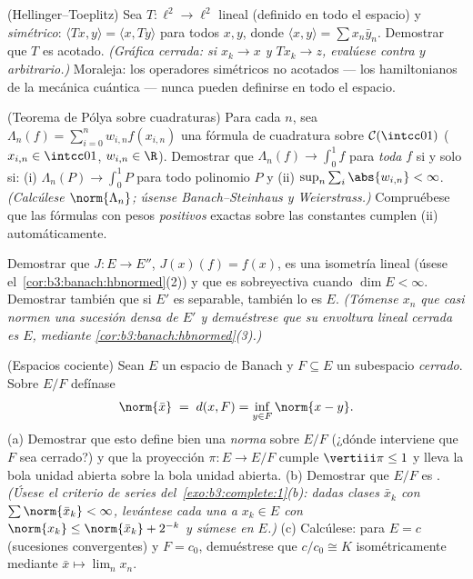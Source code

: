 \begin{exercise}[$\star\star\star$]\label{exo:b3:banach:8}
(Hellinger--Toeplitz) Sea $T \colon \ell^2 \to \ell^2$ lineal (definido
en todo el espacio) y \emph{simétrico}: $\langle Tx,
y\rangle = \langle x, Ty\rangle$ para todos $x, y$, donde $\langle
x, y \rangle = \sum x_n\bar y_n$. Demostrar que $T$ es acotado.
\emph{(Gráfica cerrada: si $x_k \to x$ y $Tx_k \to z$, evalúese contra
$y$ arbitrario.)} Moraleja: los operadores simétricos no acotados ---
los hamiltonianos de la mecánica cuántica --- nunca pueden definirse en
todo el espacio.
\end{exercise}

\begin{exercise}[$\star\star\star$]\label{exo:b3:banach:9}
(Teorema de Pólya sobre cuadraturas) Para cada $n$, sea $\Lambda_n(f)
= \sum_{i=0}^{n} w_{i,n}f(x_{i,n})$ una fórmula de cuadratura sobre
$\mathcal C(\intcc01)$ ($x_{i,n} \in \intcc01$, $w_{i,n} \in
\R$). Demostrar que $\Lambda_n(f) \to \int_0^1f$ para \emph{toda} $f$
 si y solo si: (i)
$\Lambda_n(P) \to \int_0^1P$ para todo polinomio $P$ y (ii)
$\sup_n\sum_i\abs{w_{i,n}} <
\infty$. \emph{(Calcúlese $\norm{\Lambda_n}$; úsense Banach--Steinhaus y
Weierstrass.)} Compruébese que las fórmulas con pesos \emph{positivos}
exactas sobre las constantes cumplen (ii) automáticamente.
\end{exercise}

\begin{exercise}[$\star\star$]\label{exo:b3:banach:10}
Demostrar que $J \colon E \to E''$, $J(x)(f) = f(x)$, es una isometría
lineal (úsese el~\cref{cor:b3:banach:hbnormed}(2)) y que es sobreyectiva
cuando $\dim E < \infty$. Demostrar también que si $E'$ es separable,
también lo es $E$. \emph{(Tómense $x_n$ que casi normen una sucesión
densa de $E'$ y demuéstrese que su envoltura lineal cerrada es $E$,
mediante
\cref{cor:b3:banach:hbnormed}(3).)}
\end{exercise}

\begin{exercise}[$\star\star$]\label{exo:b3:banach:11}
(Espacios cociente) Sean $E$ un espacio de Banach y $F \subseteq
E$ un subespacio \emph{cerrado}. Sobre $E/F$ defínase
\[
\norm{\bar x} \;=\; d(x, F) = \inf_{y\in F}\norm{x - y} .
\]
(a) Demostrar que esto define bien una \emph{norma} sobre $E/F$ (¿dónde
interviene que $F$ sea cerrado?) y que la proyección $\pi
\colon E \to E/F$ cumple $\vertiii\pi \leq 1$ y lleva la bola unidad
abierta sobre la bola unidad abierta. (b) Demostrar que $E/F$ es
. \emph{(Úsese el criterio de
series del~\cref{exo:b3:complete:1}(b): dadas clases $\bar x_k$ con
$\sum\norm{\bar x_k} < \infty$, levántese cada una a $x_k \in E$ con
$\norm{x_k} \leq \norm{\bar x_k} + 2^{-k}$ y súmese en $E$.)} (c)
Calcúlese: para $E = c$ (sucesiones convergentes) y $F =
c_0$, demuéstrese que $c/c_0 \cong K$ isométricamente mediante
$\bar x \mapsto
\lim_nx_n$.
\end{exercise}

